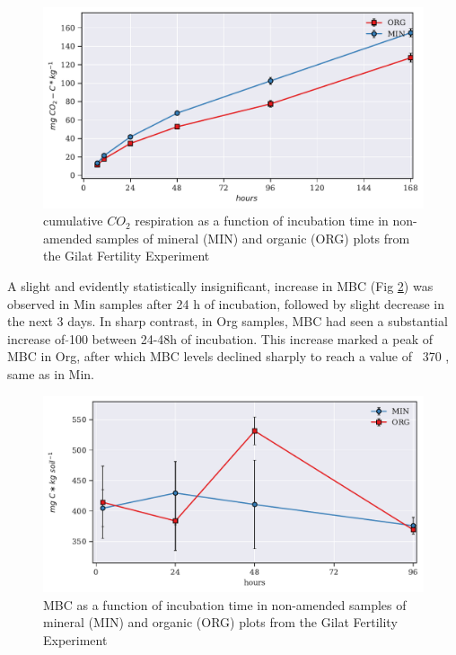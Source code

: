   			\begin{figure}[H]
  				\centering
  				\includegraphics[scale=0.8]{thesis_figures/preliminary/Cum_Resp_CON.pdf}
  				\caption{cumulative $CO_2$ respiration  as a function of incubation time in non-amended samples  of mineral (MIN) and organic (ORG) plots from the Gilat Fertility Experiment}
  				\label{fig:cum_resp_control_preliminary}
  			\end{figure}

            \noindent A slight and evidently statistically insignificant, increase in MBC (Fig \ref{fig:mbc_control_preliminary}) was observed in Min samples after 24 h of incubation, followed by slight decrease in the next 3 days.  In sharp contrast, in Org samples, MBC had seen a substantial increase of $ \tilde{} $100 \genericunit  between 24-48h of incubation. This increase marked a peak of MBC in Org, after which MBC levels declined sharply to reach a value of ~370 \genericunit, same as in Min.

        \begin{figure}[H]
            \centering
            \includegraphics[scale=0.8]{thesis_figures/preliminary/control/MBC.pdf}
            \caption{MBC  as a function of incubation time in non-amended samples  of mineral (MIN) and organic (ORG) plots from the Gilat Fertility Experiment}
            \label{fig:mbc_control_preliminary}
        \end{figure}

